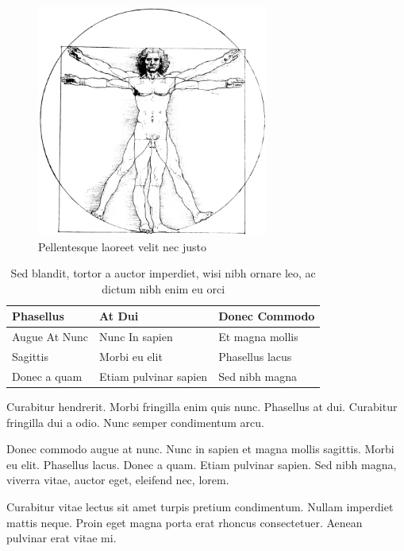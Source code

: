 \documentclass[cfonts]{nostarch}
\begin{document}
\begin{figure}[tp]
  \centering
  \includegraphics[width=3in]{vitruvian}
  \caption{Pellentesque laoreet velit nec justo}
  \label{fig:one}
\end{figure}

\begin{table}[tp]
  \centering

  \caption{Sed blandit, tortor a auctor imperdiet, wisi nibh ornare
    leo, ac dictum nibh enim eu orci}
  \begin{tabular}{lll}
    \toprule
    Phasellus &  At Dui & Donec Commodo \\
    \midrule
     Augue At Nunc & Nunc In  sapien & Et magna mollis \\
     Sagittis &  Morbi eu elit &  Phasellus lacus\\
     Donec a quam & Etiam pulvinar sapien & Sed nibh magna\\
    \bottomrule
  \end{tabular}

\label{tab:one}
\end{table}

\lipsum[60]

Curabitur hendrerit. Morbi fringilla enim
  quis nunc. Phasellus at dui. Curabitur fringilla dui a odio.
  Nunc semper condimentum arcu. 
\begin{note}
  Donec commodo augue at nunc. Nunc in sapien et magna mollis
  sagittis. Morbi eu elit. Phasellus lacus.  Donec a quam. Etiam
  pulvinar sapien. Sed nibh magna, viverra vitae, auctor eget,
  eleifend nec, lorem.
\end{note}
Curabitur vitae lectus sit amet turpis pretium condimentum. Nullam
imperdiet mattis neque. Proin eget magna porta erat rhoncus
consectetuer. Aenean pulvinar erat vitae mi.
\end{document}
